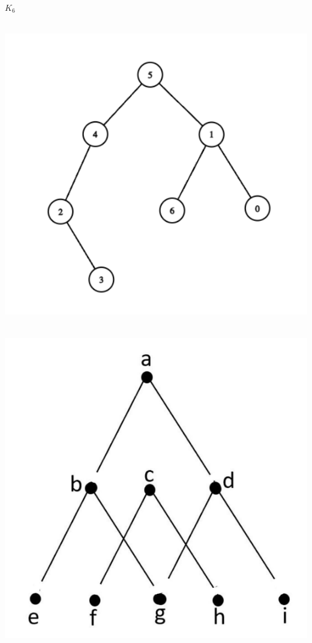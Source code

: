 \documentclass[12pt]{exam}
\begin{document}
\begin{qparts}
    \item $K_6$
    \item ~\\\includegraphics[scale = 0.8]{images/08-2d.png}
    \item ~\\\includegraphics[scale = 0.8]{images/08-2e.png}
\end{qparts}
\end{document}

